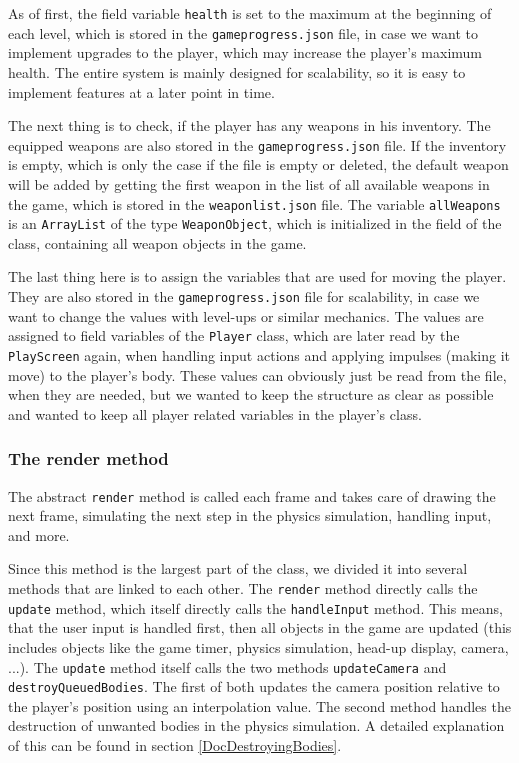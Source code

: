 \documentclass[12p]{article}
\begin{document}
As of first, the field variable \texttt{health} is set to the maximum at the beginning of each level, which is stored in the \texttt{gameprogress.json} file, in case we want to implement upgrades to the player, which may increase the player's maximum health. The entire system is mainly designed for scalability, so it is easy to implement features at a later point in time.

The next thing is to check, if the player has any weapons in his inventory. The equipped weapons are also stored in the \texttt{gameprogress.json} file. If the inventory is empty, which is only the case if the file is empty or deleted, the default weapon will be added by getting the first weapon in the list of all available weapons in the game, which is stored in the \texttt{weaponlist.json} file. The variable \texttt{allWeapons} is an \texttt{ArrayList} of the type \texttt{WeaponObject}, which is initialized in the field of the class, containing all weapon objects in the game.

The last thing here is to assign the variables that are used for moving the player. They are also stored in the \texttt{gameprogress.json} file for scalability, in case we want to change the values with level-ups or similar mechanics. The values are assigned to field variables of the \texttt{Player} class, which are later read by the \texttt{PlayScreen} again, when handling input actions and applying impulses (making it move) to the player's body. These values can obviously just be read from the file, when they are needed, but we wanted to keep the structure as clear as possible and wanted to keep all player related variables in the player's class.

\subsubsection{The render method}

The abstract \texttt{render} method is called each frame and takes care of drawing the next frame, simulating the next step in the physics simulation, handling input, and more.

Since this method is the largest part of the class, we divided it into several methods that are linked to each other. The \texttt{render} method directly calls the \texttt{update} method, which itself directly calls the \texttt{handleInput} method. This means, that the user input is handled first, then all objects in the game are updated (this includes objects like the game timer, physics simulation, head-up display, camera, ...). The \texttt{update} method itself calls the two methods \texttt{updateCamera} and \texttt{destroyQueuedBodies}. The first of both updates the camera position relative to the player's position using an interpolation value. The second method handles the destruction of unwanted bodies in the physics simulation. A detailed explanation of this can be found in section \ref{DocDestroyingBodies}.
\end{document}
